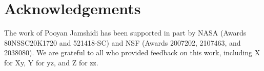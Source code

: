 \section*{Acknowledgements} The work of Pooyan Jamshidi has been supported in part by NASA (Awards 80NSSC20K1720 and 521418-SC) and NSF (Awards 2007202, 2107463, and 2038080). We are grateful to all who provided feedback on this work, including X for Xy, Y for yz, and Z for zz.
